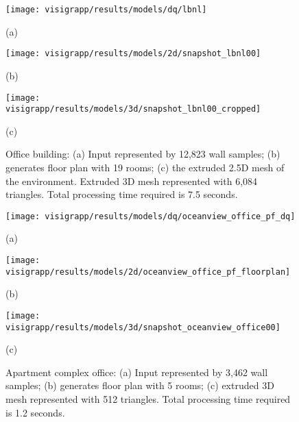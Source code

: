 \documentclass[12pt,onecolumn,oneside]{book}
\begin{document}
\begin{figure}
	\centering
	
	\begin{minipage}[b]{0.95\linewidth}
	\centerline{\texttt{[image: visigrapp/results/models/dq/lbnl]}}
	\centerline{(a)}
	\end{minipage}
	\hfill
	\begin{minipage}[b]{0.95\linewidth}
	\centerline{\texttt{[image: visigrapp/results/models/2d/snapshot\_lbnl00]}}
	\centerline{(b)}
	\end{minipage}
	\begin{minipage}[b]{0.95\linewidth}
	\centerline{\texttt{[image: visigrapp/results/models/3d/snapshot\_lbnl00\_cropped]}}
	\centerline{(c)}
	\end{minipage}

	\caption[Generated floor plan of an office building.]{Office building: (a) Input represented by 12,823 wall samples; (b) generates floor plan with 19 rooms; (c) the extruded 2.5D mesh of the environment. Extruded 3D mesh represented with 6,084 triangles.  Total processing time required is 7.5 seconds.}
	\label{fig:visigrapp_results_a}
\end{figure}

\begin{figure}[t]
	\centering
	
	\begin{minipage}[b]{0.50\linewidth}
	\centerline{\texttt{[image: visigrapp/results/models/dq/oceanview\_office\_pf\_dq]}}
	\centerline{(a)}
	\end{minipage}
	\hfill
	\begin{minipage}[b]{0.45\linewidth}
	\centerline{\texttt{[image: visigrapp/results/models/2d/oceanview\_office\_pf\_floorplan]}}
	\centerline{(b)}
	\end{minipage}
	\begin{minipage}[b]{0.95\linewidth}
	\centerline{\texttt{[image: visigrapp/results/models/3d/snapshot\_oceanview\_office00]}}
	\centerline{(c)}
	\end{minipage}

	\caption[Floor plan of an apartment complex office.]{Apartment complex office: (a) Input represented by 3,462 wall samples; (b) generates floor plan with 5 rooms; (c) extruded 3D mesh represented with 512 triangles.  Total processing time required is 1.2 seconds.}
	\label{fig:visigrapp_results_d}
\end{figure}
\end{document}
